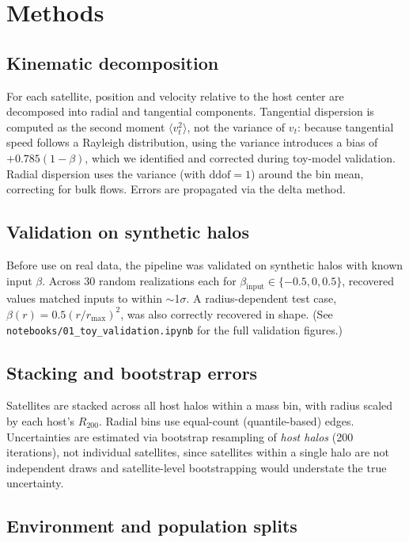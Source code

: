 \documentclass[11pt]{article}
\begin{document}
\section{Methods}

\subsection{Kinematic decomposition}

For each satellite, position and velocity relative to the host center
are decomposed into radial and tangential components. Tangential
dispersion is computed as the second moment $\langle v_t^2 \rangle$,
not the variance of $v_t$: because tangential speed follows a
Rayleigh distribution, using the variance introduces a bias of
$+0.785(1-\beta)$, which we identified and corrected during toy-model
validation. Radial dispersion uses the variance (with $\mathrm{ddof}=1$)
around the bin mean, correcting for bulk flows. Errors are propagated
via the delta method.

\subsection{Validation on synthetic halos}

Before use on real data, the pipeline was validated on synthetic
halos with known input $\beta$. Across 30 random realizations each for
$\beta_\mathrm{input} \in \{-0.5, 0, 0.5\}$, recovered values matched
inputs to within $\sim$1$\sigma$. A radius-dependent test case,
$\beta(r) = 0.5(r/r_\mathrm{max})^2$, was also correctly recovered in
shape. (See \texttt{notebooks/01\_toy\_validation.ipynb} for the full
validation figures.)

\subsection{Stacking and bootstrap errors}

Satellites are stacked across all host halos within a mass bin, with
radius scaled by each host's $R_{200}$. Radial bins use equal-count
(quantile-based) edges. Uncertainties are estimated via bootstrap
resampling of \emph{host halos} (200 iterations), not individual
satellites, since satellites within a single halo are not independent
draws and satellite-level bootstrapping would understate the true
uncertainty.

\subsection{Environment and population splits}
\end{document}
